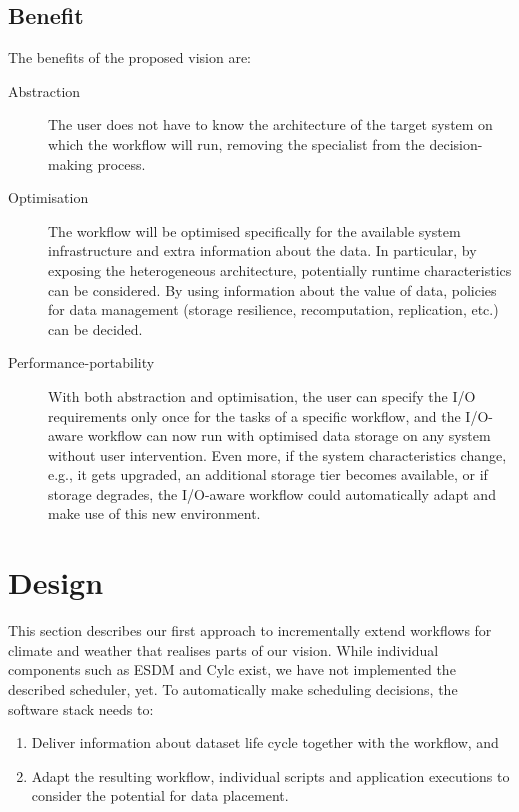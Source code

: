 \documentclass{superfri}
\begin{document}
\subsection{Benefit}

The benefits of the proposed vision are:

\begin{description}

\item[Abstraction] The user does not have to know the architecture of the target system on which the workflow will run, removing the specialist from the decision-making process.

\item[Optimisation] The workflow will be optimised specifically for the available system infrastructure and extra information about the data.
In particular, by exposing the heterogeneous architecture, potentially runtime characteristics can be considered.
By using information about the value of data, policies for data management (storage resilience,  recomputation, replication, etc.) can be decided.

\item[Performance-portability] With both abstraction and optimisation, the user can specify the I/O requirements only once for the tasks of a specific workflow, and the I/O-aware workflow can now run with optimised data storage on any system without user intervention.
Even more, if the system characteristics change, e.g., it gets upgraded, an additional storage tier becomes available, or if storage degrades, the I/O-aware workflow could automatically adapt and make use of this new environment. %

\end{description}

\section{Design}
\label{sec:design}

This section describes our first approach to incrementally extend workflows for climate and weather that realises parts of our vision.
While individual components such as ESDM and Cylc exist, we have not implemented the described scheduler, yet.
To automatically make scheduling decisions, the software stack needs to:

\begin{enumerate}

\item Deliver information about dataset life cycle together with the workflow, and

\item Adapt the resulting workflow, individual scripts and application executions to consider the potential for data placement.
\end{enumerate}
\end{document}

